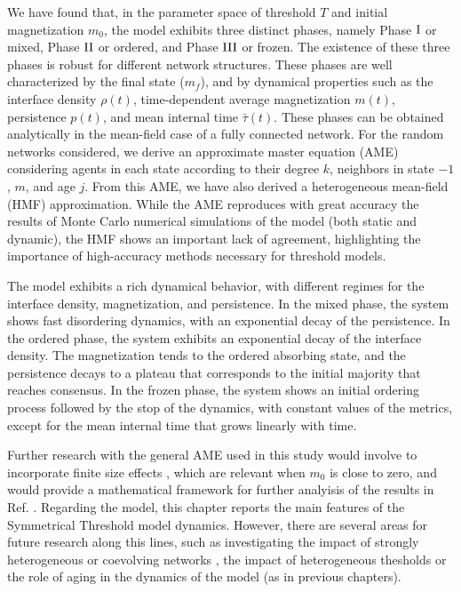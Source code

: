 We have found that, in the parameter space of threshold $T$ and initial magnetization $m_0$, the model exhibits three distinct phases, namely Phase ${\rm I}$ or mixed, Phase ${\rm II}$ or ordered, and Phase ${\rm III}$ or frozen. The existence of these three phases is robust for different network structures.
These phases are well characterized by the final state ($m_f$), and by dynamical properties such as the interface density $\rho(t)$, time-dependent average magnetization $m(t)$, persistence $p(t)$, and mean internal time $\bar{\tau}(t)$. These phases can be obtained analytically in the mean-field case of a fully connected network. For the random networks considered, we derive an approximate master equation (AME) \cite{gleeson-2013} considering agents in each state according to their degree $k$,  neighbors in state $-1$, $m$, and age $j$. From this AME, we have also derived a heterogeneous mean-field (HMF) approximation. While the AME reproduces with great accuracy the results of Monte Carlo numerical simulations of the model (both static and dynamic), the HMF shows an important lack of agreement, highlighting the importance of high-accuracy methods necessary for threshold models.

The model exhibits a rich dynamical behavior, with different regimes for the interface density, magnetization, and persistence. In the mixed phase, the system shows fast disordering dynamics, with an exponential decay of the persistence. In the ordered phase, the system exhibits an exponential decay of the interface density. The magnetization tends to the ordered absorbing state, and the persistence decays to a plateau that corresponds to the initial majority that reaches consensus. In the frozen phase, the system shows an initial ordering process followed by the stop of the dynamics, with constant values of the metrics, except for the mean internal time that grows linearly with time.

Further research with the general AME used in this study would involve to incorporate finite size effects \cite{peralta-2020B}, which are relevant when $m_0$ is close to zero, and would provide a mathematical framework for further analyisis of the results in Ref. \cite{Konstantin}. Regarding the model, this chapter reports the main features of the Symmetrical Threshold model dynamics. However, there are several areas for future research along this lines, such as investigating the impact of strongly heterogeneous \cite{barabasi2009scale} or coevolving networks \cite{Zimmermann,vazquez-2008}, the impact of heterogeneous thesholds or the role of aging in the dynamics of the model (as in previous chapters).